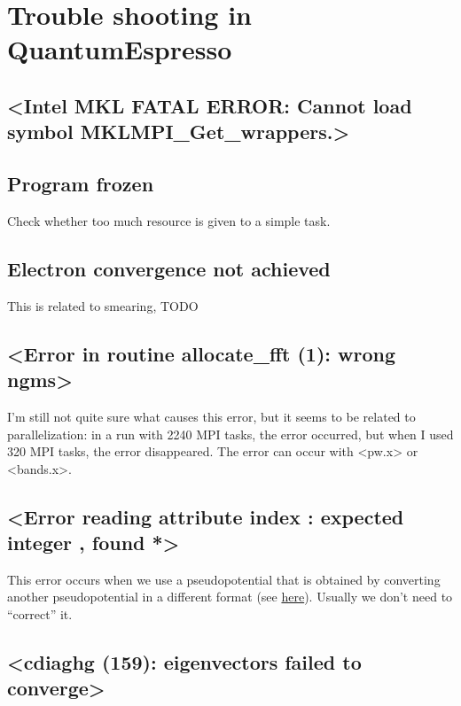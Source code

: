 \documentclass[hyperref, a4paper]{report}
\def\texttt#1{<#1>}%
\newcommand{\shortcode}[1]{\texttt{#1}}
\begin{document}
\section{Trouble shooting in QuantumEspresso}

\subsection{\shortcode{Intel MKL FATAL ERROR: Cannot load symbol MKLMPI_Get_wrappers.}}



\subsection{Program frozen}


Check whether too much resource is given to a simple task.

\subsection{Electron convergence not achieved}

This is related to smearing, TODO 

\subsection{\shortcode{Error in routine allocate_fft (1): wrong ngms}}\label{sec:ngms}

I'm still not quite sure what causes this error,
but it seems to be related to parallelization:
in a run with 2240 MPI tasks, 
the error occurred,
but when I used 320 MPI tasks,
the error disappeared.
The error can occur with \shortcode{pw.x} or \shortcode{bands.x}.

\subsection{\shortcode{Error reading attribute index : expected integer , found *}}

This error occurs when we use a pseudopotential 
that is obtained by converting another pseudopotential in a different format
(see \href{https://lists.quantum-espresso.org/pipermail/users/2021-February/046995.html}{here}). 
Usually we don't need to ``correct'' it.

\subsection{\shortcode{cdiaghg (159): eigenvectors failed to converge}}
\end{document}
